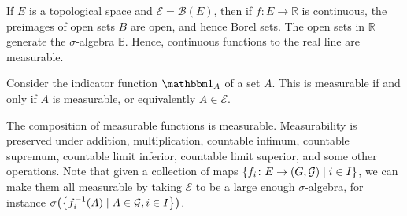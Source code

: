 If \( E \) is a topological space and \( \mathcal E = \mathcal B(E) \), then if \( f \colon E \to \mathbb R \) is continuous, the preimages of open sets \( B \) are open, and hence Borel sets.
The open sets in \( \mathbb R \) generate the \( \sigma \)-algebra \( \mathbb B \).
Hence, continuous functions to the real line are measurable.
\begin{example}
	Consider the indicator function \( \mathbbm 1_A \) of a set \( A \).
	This is measurable if and only if \( A \) is measurable, or equivalently \( A \in \mathcal E \).
\end{example}
\begin{example}
	The composition of measurable functions is measurable.
	Measurability is preserved under addition, multiplication, countable infimum, countable supremum, countable limit inferior, countable limit superior, and some other operations.
	Note that given a collection of maps \( \qty{f_i \colon E \to (G,\mathcal G) \mid i \in I} \), we can make them all measurable by taking \( \mathcal E \) to be a large enough \( \sigma \)-algebra, for instance \( \sigma\qty(\qty{f_i^{-1}(A) \mid A \in \mathcal G, i \in I}) \).
\end{example}

